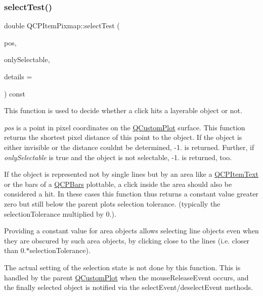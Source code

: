 \subsubsection{\texorpdfstring{select\+Test()}{selectTest()}\hspace{0.1cm}{\footnotesize\ttfamily [1/2]}}
{\footnotesize\ttfamily double Q\+C\+P\+Item\+Pixmap\+::select\+Test (\begin{DoxyParamCaption}\item[{const Q\+PointF \&}]{pos,  }\item[{bool}]{only\+Selectable,  }\item[{Q\+Variant $\ast$}]{details = {} }\end{DoxyParamCaption}) const\hspace{0.3cm}{\ttfamily [virtual]}}

This function is used to decide whether a click hits a layerable object or not.

{\itshape pos} is a point in pixel coordinates on the \hyperlink{class_q_custom_plot}{Q\+Custom\+Plot} surface. This function returns the shortest pixel distance of this point to the object. If the object is either invisible or the distance couldn\textquotesingle{}t be determined, -\/1. is returned. Further, if {\itshape only\+Selectable} is true and the object is not selectable, -\/1. is returned, too.

If the object is represented not by single lines but by an area like a \hyperlink{class_q_c_p_item_text}{Q\+C\+P\+Item\+Text} or the bars of a \hyperlink{class_q_c_p_bars}{Q\+C\+P\+Bars} plottable, a click inside the area should also be considered a hit. In these cases this function thus returns a constant value greater zero but still below the parent plot\textquotesingle{}s selection tolerance. (typically the selection\+Tolerance multiplied by 0.).

Providing a constant value for area objects allows selecting line objects even when they are obscured by such area objects, by clicking close to the lines (i.\+e. closer than 0.$\ast$selection\+Tolerance).

The actual setting of the selection state is not done by this function. This is handled by the parent \hyperlink{class_q_custom_plot}{Q\+Custom\+Plot} when the mouse\+Release\+Event occurs, and the finally selected object is notified via the select\+Event/deselect\+Event methods.

